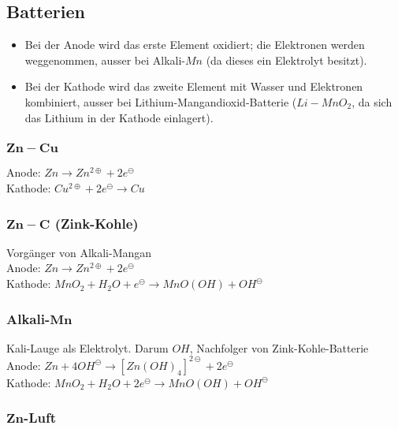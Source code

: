 \subsection{Batterien}

\begin{itemize}
	\item Bei der Anode wird das erste Element oxidiert; die Elektronen werden weggenommen, ausser bei Alkali-$Mn$ (da dieses ein Elektrolyt besitzt).
	\item Bei der Kathode wird das zweite Element mit Wasser und Elektronen kombiniert, ausser bei Lithium-Mangandioxid-Batterie ($Li-MnO_2$, da sich das Lithium in der Kathode einlagert).
\end{itemize}

\subsubsection{$\boldsymbol{Zn-Cu}$}

Anode: $Zn \rightarrow Zn^{2\oplus} + 2e^\ominus$\\

Kathode: $Cu^{2\oplus} + 2e^\ominus \rightarrow Cu$

\subsubsection{$\boldsymbol{Zn-C}$ (Zink-Kohle)}

Vorgänger von Alkali-Mangan\\

Anode: $Zn \rightarrow Zn^{2\oplus} + 2e^\ominus$\\

Kathode: $MnO_2 + H_2O + e^\ominus \rightarrow MnO(OH) + OH^\ominus$

\subsubsection{Alkali-$\boldsymbol{Mn}$}

Kali-Lauge als Elektrolyt. Darum $OH$, Nachfolger von Zink-Kohle-Batterie\\

Anode: $Zn + 4OH^\ominus \rightarrow [Zn(OH)_4]^{2\ominus} + 2e^\ominus$\\

Kathode: $MnO_2 + H_2O + 2e^\ominus \rightarrow MnO(OH) +OH^\ominus$

\subsubsection{$\boldsymbol{Zn}$-Luft}

